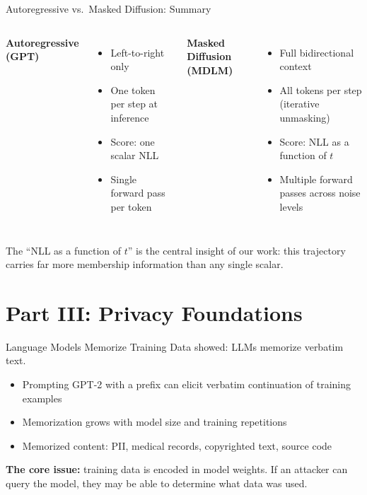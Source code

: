 \documentclass[10pt, aspectratio=169]{beamer}
\begin{document}
\begin{frame}{Autoregressive vs.\ Masked Diffusion: Summary}
  \begin{columns}[T]
    \textbf{Autoregressive (GPT)}
    \begin{itemize}
      \item Left-to-right only
      \item One token per step at inference
      \item Score: one scalar NLL
      \item Single forward pass per token
    \end{itemize}
    \textbf{Masked Diffusion (MDLM)}
    \begin{itemize}
      \item Full bidirectional context
      \item All tokens per step (iterative unmasking)
      \item Score: NLL as a function of $t$
      \item Multiple forward passes across noise levels
    \end{itemize}
  \end{columns}
  \vspace{12pt}
  The ``NLL as a function of $t$'' is the central insight of our work:
  this trajectory carries far more membership information than any single scalar.
\end{frame}

\section{Part III: Privacy Foundations}

\begin{frame}{Language Models Memorize Training Data}
  \citet{carlini2021extracting} showed: LLMs memorize verbatim text.
  \begin{itemize}
    \item Prompting GPT-2 with a prefix can elicit verbatim continuation of training examples
    \item Memorization grows with model size and training repetitions
    \item Memorized content: PII, medical records, copyrighted text, source code
  \end{itemize}
  \vspace{8pt}
  \textbf{The core issue:} training data is encoded in model weights.
  If an attacker can query the model, they may be able to determine what data was used.
\end{frame}
\end{document}
